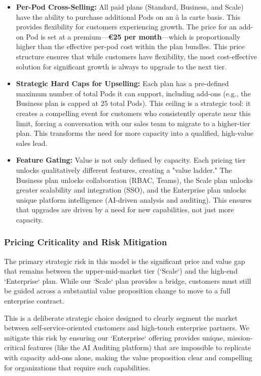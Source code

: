 \documentclass[11pt, a4paper, oneside]{article}
\begin{document}
\begin{itemize}
    \item \textbf{Per-Pod Cross-Selling:} All paid plans (Standard, Business, and Scale) have the ability to purchase additional Pods on an à la carte basis. This provides flexibility for customers experiencing growth. The price for an add-on Pod is set at a premium---\textbf{\euro{25} per month}---which is proportionally higher than the effective per-pod cost within the plan bundles. This price structure ensures that while customers have flexibility, the most cost-effective solution for significant growth is always to upgrade to the next tier.

    \item \textbf{Strategic Hard Caps for Upselling:} Each plan has a pre-defined maximum number of total Pods it can support, including add-ons (e.g., the Business plan is capped at 25 total Pods). This ceiling is a strategic tool: it creates a compelling event for customers who consistently operate near this limit, forcing a conversation with our sales team to migrate to a higher-tier plan. This transforms the need for more capacity into a qualified, high-value sales lead.

    \item \textbf{Feature Gating:} Value is not only defined by capacity. Each pricing tier unlocks qualitatively different features, creating a "value ladder." The Business plan unlocks collaboration (RBAC, Teams), the Scale plan unlocks greater scalability and integration (SSO), and the Enterprise plan unlocks unique platform intelligence (AI-driven analysis and auditing). This ensures that upgrades are driven by a need for new capabilities, not just more capacity.
\end{itemize}

\subsubsection{Pricing Criticality and Risk Mitigation}

The primary strategic risk in this model is the significant price and value gap that remains between the upper-mid-market tier (`Scale`) and the high-end `Enterprise` plan. While our `Scale` plan provides a bridge, customers must still be guided across a substantial value proposition change to move to a full enterprise contract.

This is a deliberate strategic choice designed to clearly segment the market between self-service-oriented customers and high-touch enterprise partners. We mitigate this risk by ensuring our `Enterprise` offering provides unique, mission-critical features (like the AI Auditing platform) that are impossible to replicate with capacity add-ons alone, making the value proposition clear and compelling for organizations that require such capabilities.
\end{document}
